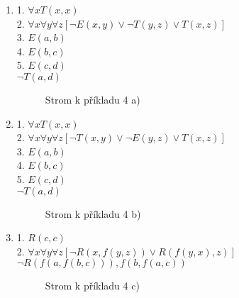 \documentclass[a4paper]{article}
\theoremstyle{definition}
\begin{document}
\begin{enumerate}
    \item 1. $ \forall xT(x,x) $\\
    2. $ \forall x\forall y\forall z\left[\neg E(x,y)\vee \neg T(y,z)\vee T(x,z)\right] $\\
    3. $ E(a,b) $\\
    4. $ E(b,c) $\\
    5. $ E(c,d) $\\
    $ \neg T(a,d) $

    \begin{figure}[htb]
        \centering
        
        \caption{Strom k příkladu 4 a)}
    \end{figure}

    \item 1. $ \forall xT(x,x) $\\
    2. $ \forall x\forall y\forall z\left[\neg T(x,y)\vee \neg E(y,z)\vee T(x,z)\right] $\\
    3. $ E(a,b) $\\
    4. $ E(b,c) $\\
    5. $ E(c,d) $\\
    $ \neg T(a,d) $

    \begin{figure}[htb]
        \centering
        
        \caption{Strom k příkladu 4 b)}
    \end{figure}

    \item 1. $ R(c,c) $\\
    2. $ \forall x\forall y\forall z\left[\neg R(x,f(y,z))\vee R(f(y,x),z)\right] $\\
    $ \neg R(f(a,f(b,c))),f(b,f(a,c)) $

    \begin{figure}[htb]
        \centering
        
        \caption{Strom k příkladu 4 c)}
    \end{figure}
\end{enumerate}
\end{document}
